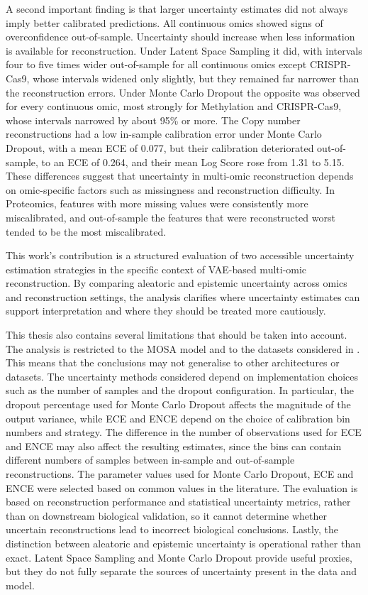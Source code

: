 A second important finding is that larger uncertainty estimates did not always imply better calibrated predictions. All continuous omics showed signs of overconfidence out-of-sample. Uncertainty should increase when less information is available for reconstruction. Under Latent Space Sampling it did, with intervals four to five times wider out-of-sample for all continuous omics except CRISPR-Cas9, whose intervals widened only slightly, but they remained far narrower than the reconstruction errors. Under Monte Carlo Dropout the opposite was observed for every continuous omic, most strongly for Methylation and CRISPR-Cas9, whose intervals narrowed by about 95\% or more. The Copy number reconstructions had a low in-sample calibration error under Monte Carlo Dropout, with a mean ECE of 0.077, but their calibration deteriorated out-of-sample, to an ECE of 0.264, and their mean Log Score rose from 1.31 to 5.15. These differences suggest that uncertainty in multi-omic reconstruction depends on omic-specific factors such as missingness and reconstruction difficulty. In Proteomics, features with more missing values were consistently more miscalibrated, and out-of-sample the features that were reconstructed worst tended to be the most miscalibrated.

This work's contribution is a structured evaluation of two accessible uncertainty estimation strategies in the specific context of VAE-based multi-omic reconstruction. By comparing aleatoric and epistemic uncertainty across omics and reconstruction settings, the analysis clarifies where uncertainty estimates can support interpretation and where they should be treated more cautiously.

This thesis also contains several limitations that should be taken into account. The analysis is restricted to the MOSA model and to the datasets considered in \cite{Cai2024}. This means that the conclusions may not generalise to other architectures or datasets. The uncertainty methods considered depend on implementation choices such as the number of samples and the dropout configuration. In particular, the dropout percentage used for Monte Carlo Dropout affects the magnitude of the output variance, while ECE and ENCE depend on the choice of calibration bin numbers and strategy. The difference in the number of observations used for ECE and ENCE may also affect the resulting estimates, since the bins can contain different numbers of samples between in-sample and out-of-sample reconstructions. The parameter values used for Monte Carlo Dropout, ECE and ENCE were selected based on common values in the literature. The evaluation is based on reconstruction performance and statistical uncertainty metrics, rather than on downstream biological validation, so it cannot determine whether uncertain reconstructions lead to incorrect biological conclusions. Lastly, the distinction between aleatoric and epistemic uncertainty is operational rather than exact. Latent Space Sampling and Monte Carlo Dropout provide useful proxies, but they do not fully separate the sources of uncertainty present in the data and model.

